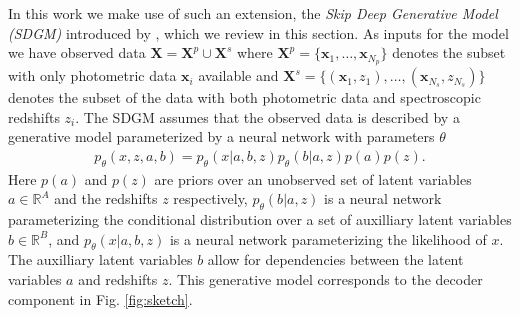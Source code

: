 In this work we make use of such an extension, the \textit{Skip Deep Generative Model (SDGM)} introduced by \cite{maaloeAuxiliaryDeepGenerative2016}, which we review in this section. As inputs for the model we have observed data $\mathbf{X} = \mathbf{X}^p \cup \mathbf{X}^s$ where $\mathbf{X}^p = \{ \mathbf{x}_1,\dots,\mathbf{x}_{N_p} \}$ denotes the subset with only photometric data $\mathbf{x}_i$ available and $\mathbf{X}^s = \{ (\mathbf{x}_1, z_1), \dots , (\mathbf{x}_{N_s}, z_{N_s}) \}$ denotes the subset of the data with both photometric data and spectroscopic redshifts $z_i$. The SDGM assumes that the observed data is described by a generative model parameterized by a neural network with parameters $\theta$ 
\begin{align}
    p_\theta(x, z, a, b) = p_\theta(x|a,b,z) p_\theta(b|a,z) p(a) p(z).    
\end{align}
Here $p(a)$ and $p(z)$ are priors over an unobserved set of latent variables $a\in\mathbb{R}^A$ and the redshifts $z$ respectively, $p_\theta(b|a,z)$ is a neural network parameterizing the conditional distribution over a set of auxilliary latent variables $b\in\mathbb{R}^B$, and $p_\theta(x|a,b,z)$ is a neural network parameterizing the likelihood of $x$. The auxilliary latent variables $b$ allow for dependencies between the latent variables $a$ and redshifts $z$. This generative model corresponds to the decoder component in Fig. \ref{fig:sketch}.

